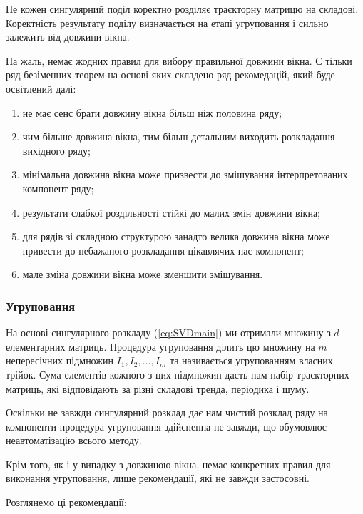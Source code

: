 Не кожен сингулярний поділ коректно розділяє траєкторну матрицю на складові. Коректність результату поділу визначається на етапі угруповання і сильно залежить від довжини вікна.

На жаль, немає жодних правил для вибору правильної довжини вікна. Є тільки ряд безіменних теорем на основі яких складено ряд рекомедацій, який буде освітлений далі:

\begin{enumerate}
	\item не має сенс брати довжину вікна більш ніж половина ряду;
	\item чим більше довжина вікна, тим більш детальним виходить розкладання вихідного ряду;
	\item мінімальна довжина вікна може призвести до змішування інтерпретованих компонент ряду;
	\item результати слабкої роздільності стійкі до малих змін довжини вікна;
	\item для рядів зі складною структурою занадто велика довжина вікна може привести до небажаного розкладання цікавлячих нас компонент;
	\item мале зміна довжини вікна може зменшити змішування.
\end{enumerate}

\subsubsection{Угруповання}

На основі сингулярного розкладу (\ref{eq:SVDmain}) ми отримали множину з $d$ елементарних матриць. Процедура угруповання ділить цю множину на $m$ непересічних підмножин $I_{1}, I_{2}, \dots, I_{m}$ та називається угрупованням власних трійок. Сума елементів кожного з цих підмножин дасть нам набір траєкторних матриць, які відповідають за різні складові тренда, періодика і шуму.

Оскільки не завжди сингулярний розклад дає нам чистий розклад ряду на компоненти процедура угруповання здійсненна не завжди, що обумовлює неавтоматізацію всього методу.

Крім того, як і у випадку з довжиною вікна, немає конкретних правил для виконання угруповання, лише рекомендації, які не завжди застосовні. 

Розглянемо ці рекомендації:


